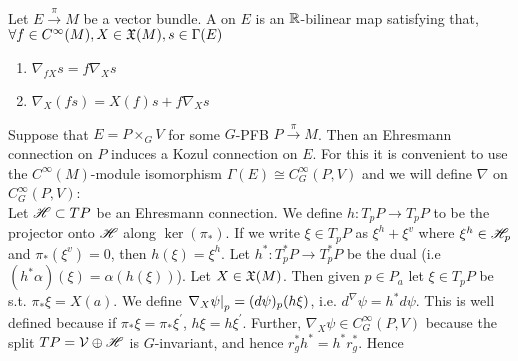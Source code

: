 \documentclass{article}
\begin{document}
\begin{definition}
Let $E \overset{\pi}{\to} M$ be a vector bundle. A  on $E$ is an $\mathbb{R}$-bilinear map
satisfying that, $\forall f \in C^\infty(M), X \in \mathfrak{X}(M), s \in \Gamma(E)$
\begin{enumerate}
    \item $\nabla_{fX}s = f \nabla_X s $
    \item $\nabla_X(fs) = X(f) s + f \nabla_X s $
\end{enumerate}
\end{definition}

Suppose that $E = P \times_G V$ for some $G$-PFB $P \overset{\pi}{\to}M$. Then an Ehresmann connection on $P$ induces a Kozul connection on $E$. For this it is convenient to use the $C^\infty(M)$-module isomorphism $\Gamma(E) \cong C_G^\infty(P,V)$ and we will define $\nabla$ on $C_G^\infty(P,V)$:\\
Let $\mathscr{H} \subset TP$ be an Ehresmann connection. We define $h: T_pP \to T_p P $ to be the projector onto $\mathscr{H}$ along $\ker(\pi_\ast)$. If we write $\xi \in T_pP$ as $\xi^h + \xi^v$ where $\xi^h \in \mathscr{H}_p$ and $\pi_\ast(\xi^v) = 0$, then $h(\xi) = \xi^h$. Let $h^\ast : T_p^\ast P \to T_p^\ast P$ be the dual (i.e $(h^\ast \alpha)(\xi) = \alpha(h(\xi))$). Let $X \in \mathfrak{X}(M)$. Then given $p \in P_a$ let $\xi \in T_pP$ be s.t. $\pi_\ast \xi = X(a)$. We define $\left. \nabla_X \psi \right\rvert_{p} = (d\psi)_p(h\xi)$, i.e. $d^\nabla \psi = h^\ast d\psi$. This is well defined because if $\pi_\ast \xi = \pi_\ast \xi^\prime$, $h\xi = h\xi^\prime$. Further, $\nabla_X \psi \in C^\infty_G(P,V)$ because the split $TP = \mathcal{V} \oplus \mathscr{H}$ is $G$-invariant, and hence $r_g^\ast h^\ast= h^\ast r_g^\ast $. Hence 
\end{document}
